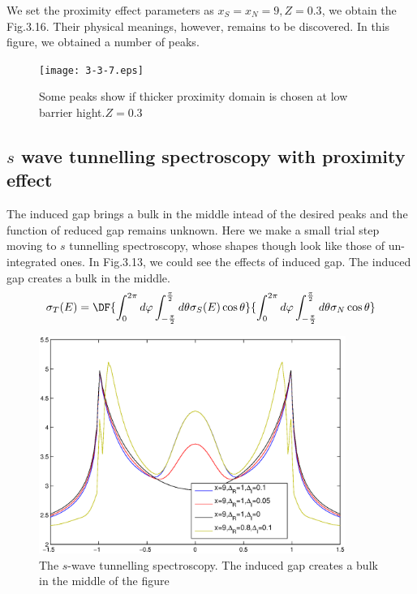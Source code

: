 We set the proximity effect parameters as $x_S=x_N=9,Z=0.3$, we obtain the Fig.3.16. Their physical meanings, however, remains to be discovered. In this figure, we obtained a number of peaks.
\begin{figure}[htbp]
\small
\centering
\texttt{[image: 3-3-7.eps]}
\caption{Some peaks show if thicker proximity domain is chosen at low barrier hight.$Z=0.3$}
\label{fig:10}
\end{figure}
\subsection{$s$ wave tunnelling spectroscopy with proximity effect}
The induced gap brings a bulk in the middle intead of the desired peaks and the function of reduced gap remains unknown. Here we make a small trial step moving to $s$ tunnelling spectroscopy, whose shapes though look like those of un-integrated ones.
In Fig.3.13, we could see the effects of induced gap. The induced gap creates a bulk in the middle.
\begin{eqnarray}
\sigma_T(E)=\DF{\int_0^{2\pi}d\varphi\int_{-\frac{\pi}{2}}^{\frac{\pi}{2}}d\theta \sigma_S(E)\cos\theta}{\int_{0}^{2\pi}d\varphi\int_{-\frac{\pi}{2}}^{\frac{\pi}{2}}d\theta\sigma_N\cos\theta}
\end{eqnarray}
\begin{figure}[htbp]
\small
\centering
\includegraphics[width=10cm]{./Figures/3-3-8.eps}
\caption{The $s$-wave tunnelling spectroscopy. The induced gap creates a bulk in the middle of the figure}
\label{fig:10}
\end{figure}









